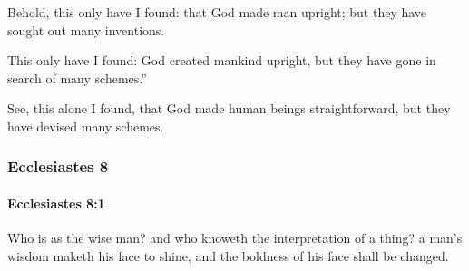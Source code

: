 			\begin{versebox}
					\item[BHS] 
					\item[LXX] 
					\item[ASV] Behold, this only have I found: that God made man upright; but they have sought out many inventions.
					\item[NIV] This only have I found: God created mankind upright, but they have gone in search of many schemes.”
					\item[NRSV] See, this alone I found, that God made human beings straightforward, but they have devised many schemes.
			\end{versebox}
	\subsubsection{Ecclesiastes 8} %
		\label{ECCLESIASTES-8}

		\paragraph{Ecclesiastes 8:1} %
			\label{ECCLESIASTES-8-1}

			Who is as the wise man? and who knoweth the interpretation of a thing? a man’s wisdom maketh his face to shine, and the boldness of his face shall be changed.


